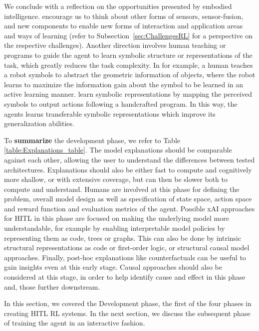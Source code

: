 \documentclass[twoside,11pt]{article}
\begin{document}
We conclude with a reflection on the opportunities presented by embodied intelligence. \citet{RoyEtAl:2021:RLRoboticsChallenges} encourage us to think about other forms of sensors, sensor-fusion, and new components to enable new forms of interaction and application areas and ways of learning (refer to Subsection~\ref{sec:ChallengesRL} for a perspective on the respective challenges). Another direction involves human teaching \citep{kulick2013active} or programs \citep{PenkovR19,sun2019program} to guide the agent to learn symbolic structure or representations of the task, which greatly reduces the task complexity. In \citet{kulick2013active} for example, a human teaches a robot symbols to abstract the geometric information of objects, where the robot learns to maximize the information gain about the symbol to be learned in an active learning manner. \citet{PenkovR19} learn symbolic representations by mapping the perceived symbols to output actions following a handcrafted program. In this way, the agents learns transferable symbolic representations which improve its generalization abilities.

\noindent To \textbf{summarize} the development phase, we refer to Table \ref{table:Explanations_table}. The model explanations should be comparable against each other, allowing the user to understand the differences between tested architectures. Explanations should also be either fast to compute and cognitively more shallow, or with extensive coverage, but can then be slower both to compute and understand. Humans are involved at this phase for defining the problem, overall model design as well as specification of state space, action space and reward function and evaluation metrics of the agent. Possible xAI approaches for HITL in this phase are focused on making the underlying model more understandable, for example by enabling interpretable model policies by representing them as code, trees or graphs. This can also be done by intrinsic structural representations as code or first-order logic, or structural causal model approaches. Finally, post-hoc explanations like counterfactuals can be useful to gain insights even at this early stage. Causal approaches should also be considered at this stage, in order to help identify cause and effect in this phase and, those further downstream.


In this section, we covered the Development phase, the first of the four phases in creating HITL RL systems. In the next section, we discuss the subsequent phase of training the agent in an interactive fashion.
\end{document}
